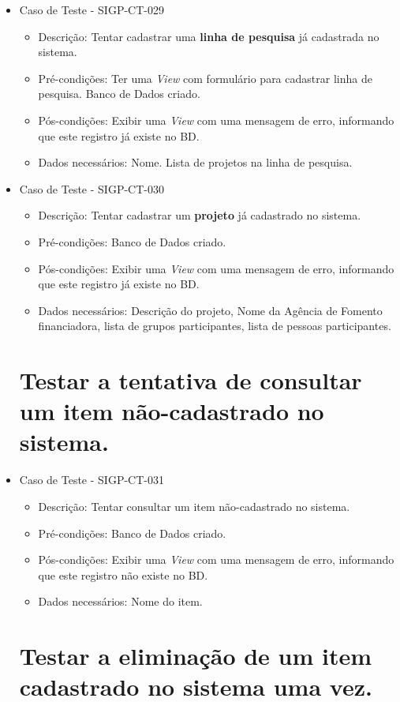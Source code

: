 \documentclass[11pt, a4paper]{book}
\begin{document}
\begin{itemize}
	\item Caso de Teste - SIGP-CT-029
	\begin{itemize}
	\item Descrição: Tentar cadastrar uma \textbf{linha de pesquisa} já cadastrada no sistema.
	\item Pré-condições: Ter uma \emph{View} com formulário para cadastrar linha de pesquisa. Banco de Dados criado.
		\item Pós-condições: Exibir uma \emph{View} com uma mensagem de erro, informando que este registro já existe no BD.
	\item Dados necessários: Nome. Lista de projetos na linha de pesquisa.
	\end{itemize}

	\item Caso de Teste - SIGP-CT-030
	\begin{itemize}
	\item Descrição: Tentar cadastrar um \textbf{projeto} já cadastrado no sistema.
	\item Pré-condições: Banco de Dados criado.
	\item Pós-condições: Exibir uma \emph{View} com uma mensagem de erro, informando que este registro já existe no BD.
	\item Dados necessários: Descrição do projeto, Nome da Agência de Fomento financiadora, lista de grupos participantes, lista de pessoas participantes.
	\end{itemize}

\newpage
\section{Testar a tentativa de consultar um item não-cadastrado no sistema.}

	\item Caso de Teste - SIGP-CT-031
	\begin{itemize}
	\item Descrição: Tentar consultar um item não-cadastrado no sistema.
	\item Pré-condições: Banco de Dados criado.
	\item Pós-condições: Exibir uma \emph{View} com uma mensagem de erro, informando que este registro não existe no BD.
	\item Dados necessários: Nome do item.
	\end{itemize}

\newpage
\section{Testar a eliminação de um item cadastrado no sistema uma vez.}
\label{sec:elimumavez}


\end{itemize}
\end{document}
